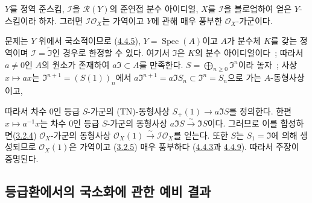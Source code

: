 \begin{proposition}[8.1.11]
\label{II.8.1.11-ko}
$Y$를 정역 준스킴, $\mathcal{I}$을 $\mathcal{R}(Y)$의 준연접 분수
아이디얼, $X$를 $\mathcal{I}$을 블로업하여 얻은 $Y$-스킴이라 하자.
그러면 $\mathcal{I}\mathcal{O}_X$는 가역이고 $Y$에 관해 매우 풍부한
$\mathcal{O}_X$-가군이다.
\end{proposition}

문제는 $Y$ 위에서 국소적이므로
(\hyperref[II.4.4.5-ko]{4.4.5}), $Y=\operatorname{Spec}(A)$이고
$A$가 분수체 $K$를 갖는 정역이며
$\mathcal{I}=\widetilde{\mathfrak{I}}$인 경우로 한정할 수 있다. 여기서
$\mathfrak{I}$은 $K$의 분수 아이디얼이다~; 따라서
$a\neq0$인 $A$의 원소가 존재하여 $a\mathfrak{I}\subset A$를
만족한다. $S=\bigoplus_{n\geq0}\mathfrak{I}^n$이라 놓자~; 사상
$x\mapsto ax$는 $\mathfrak{I}^{n+1}=(S(1))_n$에서
$a\mathfrak{I}^{n+1}=a\mathfrak{I}S_n\subset\mathfrak{I}^n=S_n$으로
가는 $A$-동형사상이고,

따라서 차수 $0$인 등급 $S$-가군의 (TN)-동형사상
$S_+(1)\to a\mathfrak{I}S$를 정의한다. 한편 $x\mapsto a^{-1}x$는 차수
$0$인 등급 $S$-가군의 동형사상
$a\mathfrak{I}S\xrightarrow{\sim}\mathfrak{I}S$이다. 그러므로 이를
합성하면(\hyperref[II.3.2.4-ko]{3.2.4}) $\mathcal{O}_X$-가군의 동형사상
$\mathcal{O}_X(1)\xrightarrow{\sim}\mathcal{I}\mathcal{O}_X$를 얻는다. 또한
$S$는 $S_1=\mathfrak{I}$에 의해 생성되므로 $\mathcal{O}_X(1)$은 가역이고
(\hyperref[II.3.2.5-ko]{3.2.5}) 매우 풍부하다
(\hyperref[II.4.4.3-ko]{4.4.3}과 \hyperref[II.4.4.9-ko]{4.4.9}). 따라서
주장이 증명된다.

\subsection{등급환에서의 국소화에 관한 예비 결과}
\label{subsection:II.8.2-ko}

